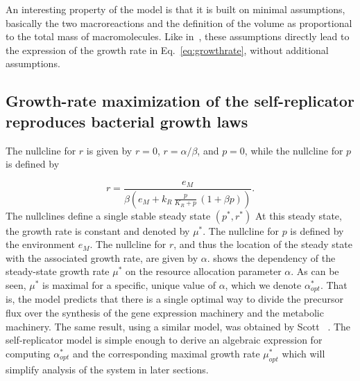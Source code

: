 An interesting property of the model is that it is built on minimal assumptions, basically the two macroreactions and the definition of the volume as proportional to the total mass of macromolecules.
Like in~\cite{molenaar_shifts_2009,pavlov_optimal_2013,scott_emergence_2014}, these assumptions directly lead to the expression of the growth rate in Eq.~\ref{eq:growthrate}, without additional assumptions.

\subsection*{Growth-rate maximization of the self-replicator reproduces bacterial growth laws}
\label{sec:growthlaws}

The nullcline for $r$ is given by $r=0$, $r=\alpha/\beta$, and $p=0$, while the nullcline for $p$ is defined by

\[
r = \frac{e_M}{\beta \left(e_M + k_R\, \frac{p}{K_R+p}\, (1+\beta p)\right)}.
\]
The nullclines define a single stable steady state $(p^*, r^*)$ 
At this steady state, the growth rate is constant and denoted by $\mu^*$.
The nullcline for $p$ is defined by the environment $e_M$.
The nullcline for $r$, and thus the location of the steady state with the associated growth rate, are given by $\alpha$.
 shows the dependency of the steady-state growth rate $\mu^*$ on the resource allocation parameter $\alpha$.
As can be seen, $\mu^*$ is maximal for a specific, unique value of $\alpha$, which we denote $\alpha_{opt}^*$.
That is, the model predicts that there is a single optimal way to divide the precursor flux over the synthesis of the gene expression machinery and the metabolic machinery.
The same result, using a similar model, was obtained by Scott \etal~\cite{scott_emergence_2014}.
The self-replicator model is simple enough to derive an algebraic expression for computing $\alpha^*_{opt}$ and the corresponding maximal growth rate $\mu^*_{opt}$  which will simplify analysis of the system in later sections.

